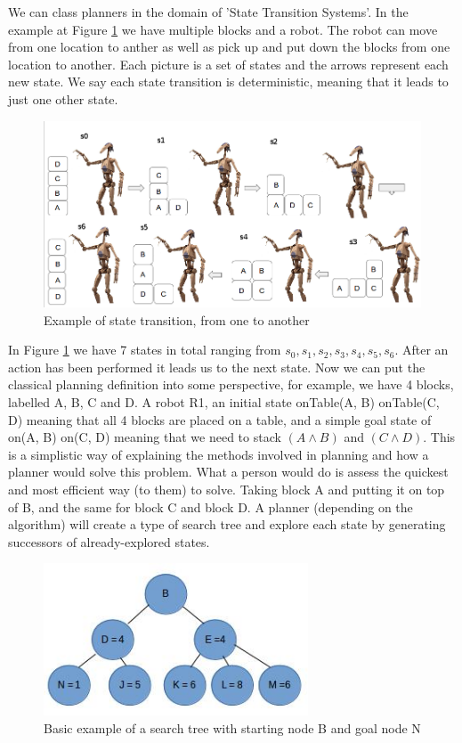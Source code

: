 We can class planners in the domain of 'State Transition Systems'. In the example at Figure \ref{fig:StateTransition} we have multiple blocks and a robot. The robot can move from one location to anther as well as pick up and put down the blocks from one location to another. Each picture is a set of states and the arrows represent each new state. We say each state transition is deterministic, meaning that it leads to just one other state. 
\begin{figure}[!htb]
    \centering
    \includegraphics[scale=0.3]{StateTransitionEdit.png}
    \caption{Example of state transition, from one to another}
    \label{fig:StateTransition}
\end{figure}
In Figure \ref{fig:StateTransition} we have 7 states in total ranging from $s_0, s_1, s_2, s_3, s_4, s_5, s_6$. After an action has been performed it leads us to the next state. Now we can put the classical planning definition into some perspective, for example, we have 4 blocks, labelled A, B, C and D. A robot R1, an initial state onTable(A, B) onTable(C, D) meaning that all 4 blocks are placed on a table, and a simple goal state of on(A, B) on(C, D) meaning that we need to stack $(A\wedge B)$ and $(C\wedge D)$. This is a simplistic way of explaining the methods involved in planning and how a planner would solve this problem. What a person would do is assess the quickest and most efficient way (to them) to solve. Taking block A and putting it on top of B, and the same for block C and block D. A planner (depending on the algorithm) will create a type of search tree and explore each state by generating successors of already-explored states.
\begin{figure}[!htb]
    \centering
    \includegraphics[scale=2.0,width=0.70\textwidth]{TreeExample.jpg}
    \caption{Basic example of a search tree with starting node B and goal node N\cite{PlanningBook}}
    \label{fig:Tree Example}
\end{figure}

